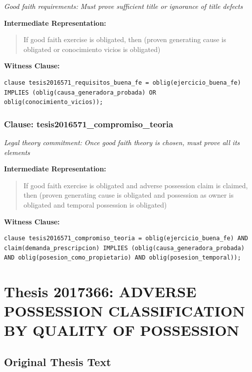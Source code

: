 \documentclass[11pt,a4paper]{article}
\begin{document}
\textit{Good faith requirements: Must prove sufficient title or ignorance of title defects}

\textbf{Intermediate Representation:}

\begin{quote}
If good faith exercise is obligated, then (proven generating cause is obligated or conocimiento vicios is obligated)
\end{quote}

\textbf{Witness Clause:}

\begin{lstlisting}[style=witnessstyle, language=Witness]
clause tesis2016571_requisitos_buena_fe = oblig(ejercicio_buena_fe) IMPLIES (oblig(causa_generadora_probada) OR oblig(conocimiento_vicios));
\end{lstlisting}

\subsubsection{Clause: tesis2016571\_compromiso\_teoria}

\textit{Legal theory commitment: Once good faith theory is chosen, must prove all its elements}

\textbf{Intermediate Representation:}

\begin{quote}
If good faith exercise is obligated and adverse possession claim is claimed, then (proven generating cause is obligated and possession as owner is obligated and temporal possession is obligated)
\end{quote}

\textbf{Witness Clause:}

\begin{lstlisting}[style=witnessstyle, language=Witness]
clause tesis2016571_compromiso_teoria = oblig(ejercicio_buena_fe) AND claim(demanda_prescripcion) IMPLIES (oblig(causa_generadora_probada) AND oblig(posesion_como_propietario) AND oblig(posesion_temporal));
\end{lstlisting}

\newpage

\section{Thesis 2017366: ADVERSE POSSESSION CLASSIFICATION BY QUALITY OF POSSESSION}
\label{thesis:2017366}

\subsection{Original Thesis Text}
\end{document}
